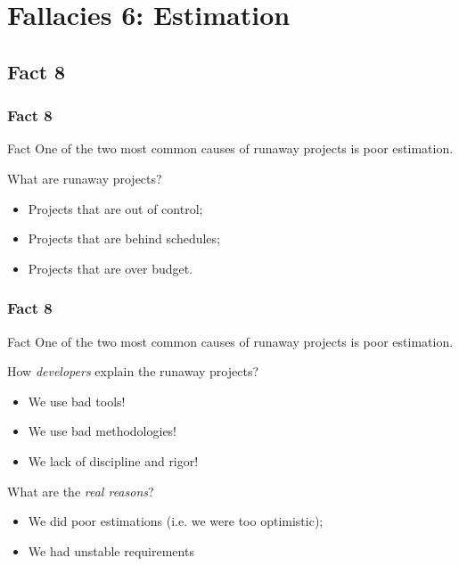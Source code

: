 \documentclass{beamer}
\begin{document}
\section{Fallacies 6: Estimation}

\subsection{Fact 8}
\begin{frame}
    \frametitle{Fact 8}
    \begin{block}{Fact}
    One of the two most common causes of runaway projects is poor estimation.
    \end{block}
    \pause

    What are runaway projects?
    \begin{itemize}
        \item Projects that are out of control;
        \pause
        \item Projects that are behind schedules;
        \pause
        \item Projects that are over budget.
    \end{itemize}
\end{frame}

\begin{frame}
    \frametitle{Fact 8}
    \begin{block}{Fact}
    One of the two most common causes of runaway projects is poor estimation.
    \end{block}
    \pause

    How \textit{developers} explain the runaway projects?
    \pause
    \begin{itemize}
        \item We use bad tools!
        \pause
        \item We use bad methodologies!
        \pause
        \item We lack of discipline and rigor!
    \end{itemize}
    \bigskip

    \pause
    What are the \textit{real reasons}?
    \begin{itemize}
        \item We did poor estimations (i.e. we were too optimistic);
        \pause
        \item We had unstable requirements
    \end{itemize}
\end{frame}
\end{document}

